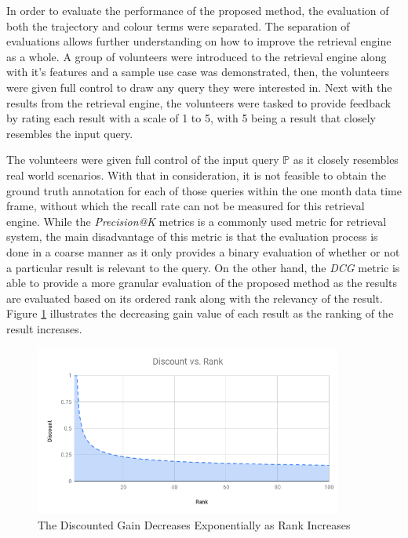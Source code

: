 In order to evaluate the performance of the proposed method, the evaluation of both the trajectory and colour terms were separated. The separation of evaluations allows further understanding on how to improve the retrieval engine as a whole. A group of volunteers were introduced to the retrieval engine along with it's features and a sample use case was demonstrated, then, the volunteers were given full control to draw any query they were interested in. Next with the results from the retrieval engine, the volunteers were tasked to provide feedback by rating each result with a scale of 1 to 5, with 5 being a result that closely resembles the input query.

The volunteers were given full control of the input query $\mathbb{P}$ as it closely resembles real world scenarios. With that in consideration, it is not feasible to obtain the ground truth annotation for each of those queries within the one month data time frame, without which the recall rate can not be measured for this retrieval engine.
While the \textit{Precision@K} metrics is a commonly used metric for retrieval system, the main disadvantage of this metric is that the evaluation process is done in a coarse manner as it only provides a binary evaluation of whether or not a particular result is relevant to the query. On the other hand, the \textit{DCG} metric is able to provide a more granular evaluation of the proposed method as the results are evaluated based on its ordered rank along with the relevancy of the result. Figure \ref{fig:dcgGain} illustrates the decreasing gain value of each result as the ranking of the result increases.

\begin{figure}[!ht]
\centering
\includegraphics[width=0.9\textwidth]{image/retrievalTwo/discountvsrank.png}
\caption{The Discounted Gain Decreases Exponentially as Rank Increases}
\label{fig:dcgGain}       %
\end{figure}

